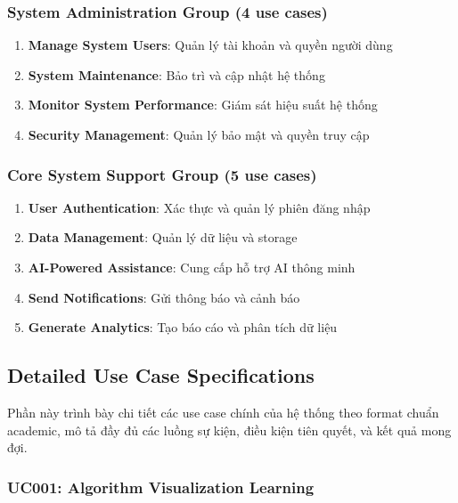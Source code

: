 \subsubsection{System Administration Group (4 use cases)}
\begin{enumerate}
    \item \textbf{Manage System Users}: Quản lý tài khoản và quyền người dùng
    \item \textbf{System Maintenance}: Bảo trì và cập nhật hệ thống
    \item \textbf{Monitor System Performance}: Giám sát hiệu suất hệ thống
    \item \textbf{Security Management}: Quản lý bảo mật và quyền truy cập
\end{enumerate}

\subsubsection{Core System Support Group (5 use cases)}
\begin{enumerate}
    \item \textbf{User Authentication}: Xác thực và quản lý phiên đăng nhập
    \item \textbf{Data Management}: Quản lý dữ liệu và storage
    \item \textbf{AI-Powered Assistance}: Cung cấp hỗ trợ AI thông minh
    \item \textbf{Send Notifications}: Gửi thông báo và cảnh báo
    \item \textbf{Generate Analytics}: Tạo báo cáo và phân tích dữ liệu
\end{enumerate}

\subsection{Detailed Use Case Specifications}
\label{subsec:detailed-usecase-specs}

Phần này trình bày chi tiết các use case chính của hệ thống theo format chuẩn academic, mô tả đầy đủ các luồng sự kiện, điều kiện tiên quyết, và kết quả mong đợi.

\subsubsection{UC001: Algorithm Visualization Learning}


